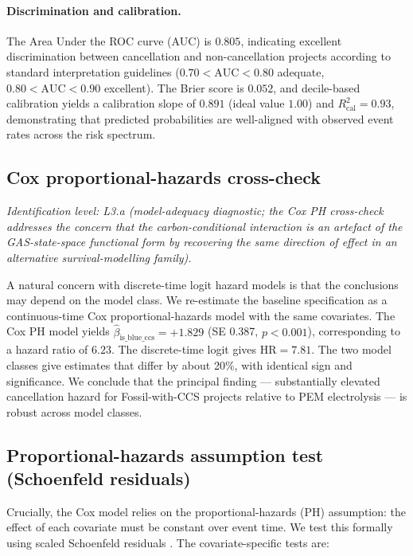 \paragraph{Discrimination and calibration.} The Area Under the ROC curve (AUC) is $0.805$, indicating excellent discrimination between cancellation and non-cancellation projects according to standard interpretation guidelines ($0.70 < \mathrm{AUC} < 0.80$ adequate, $0.80 < \mathrm{AUC} < 0.90$ excellent). The Brier score is $0.052$, and decile-based calibration yields a calibration slope of $0.891$ (ideal value $1.00$) and $R^2_{\mathrm{cal}} = 0.93$, demonstrating that predicted probabilities are well-aligned with observed event rates across the risk spectrum.

\subsection{Cox proportional-hazards cross-check}
\noindent\emph{Identification level: L3.a (model-adequacy diagnostic; the Cox PH cross-check addresses the concern that the carbon-conditional interaction is an artefact of the GAS-state-space functional form by recovering the same direction of effect in an alternative survival-modelling family).}


A natural concern with discrete-time logit hazard models is that the conclusions may depend on the model class. We re-estimate the baseline specification as a continuous-time Cox proportional-hazards model \cite{cox1972regression} with the same covariates. The Cox PH model yields $\hat\beta_{\mathrm{is\_blue\_ccs}} = +1.829$ (SE 0.387, $p < 0.001$), corresponding to a hazard ratio of $6.23$. The discrete-time logit gives $\mathrm{HR} = 7.81$. The two model classes give estimates that differ by about 20\%, with identical sign and significance. We conclude that the principal finding — substantially elevated cancellation hazard for Fossil-with-CCS projects relative to PEM electrolysis — is robust across model classes.

\subsection{Proportional-hazards assumption test (Schoenfeld residuals)}

Crucially, the Cox model relies on the proportional-hazards (PH) assumption: the effect of each covariate must be constant over event time. We test this formally using scaled Schoenfeld residuals \cite{grambsch1994proportional}. The covariate-specific tests are:

